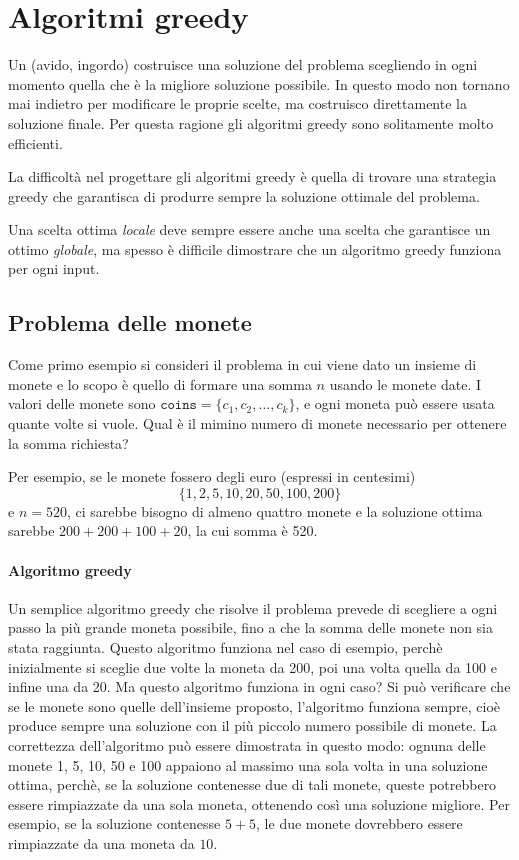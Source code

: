 \chapter{Algoritmi greedy}


Un  (avido, ingordo)
costruisce una soluzione del problema
scegliendo in ogni momento quella che è 
la migliore soluzione possibile.
In questo modo
non tornano mai indietro per modificare le proprie scelte,
ma costruisco direttamente la soluzione finale.
Per questa ragione gli algoritmi greedy sono solitamente
molto efficienti.

La difficoltà nel progettare gli algoritmi greedy
è quella di trovare una strategia greedy che garantisca 
di produrre sempre la soluzione ottimale del problema.

Una scelta ottima \textit{locale} deve sempre 
essere anche una scelta che garantisce un ottimo \textit{globale},
ma spesso è difficile dimostrare che un algoritmo greedy
funziona per ogni input.


\section{Problema delle monete}

Come primo esempio si consideri il problema 
in cui viene dato un insieme di monete e lo scopo
è quello di formare una somma $n$ usando le monete date.
I valori delle monete sono
$\texttt{coins}=\{c_1,c_2,\ldots,c_k\}$,
e ogni moneta può essere usata quante volte si vuole.
Qual è il mimino numero di monete necessario per ottenere la somma richiesta?

Per esempio, se le monete fossero degli euro (espressi in centesimi)
\[\{1,2,5,10,20,50,100,200\}\]
e $n=520$,
ci sarebbe bisogno di almeno quattro monete
e la soluzione ottima sarebbe
$200+200+100+20$, la cui somma è 520.

\subsubsection{Algoritmo greedy}

Un semplice algoritmo greedy che risolve il problema 
prevede di scegliere a ogni passo la più grande moneta possibile,
fino a che la somma delle monete non sia stata raggiunta.
Questo algoritmo funziona nel caso di esempio,
perchè inizialmente si sceglie due volte la moneta da 200,
poi una volta quella da 100 e infine una da 20.
Ma questo algoritmo funziona in ogni caso?
Si può verificare che se le monete sono quelle dell'insieme
proposto, l'algoritmo funziona sempre, cioè produce sempre 
una soluzione con il più piccolo numero possibile di monete.
La correttezza dell'algoritmo può essere dimostrata in questo modo:
ognuna delle monete 1, 5, 10, 50 e 100 appaiono al massimo 
una sola volta in una soluzione ottima,
perchè, se la soluzione contenesse due di tali monete,
queste potrebbero essere rimpiazzate da una sola moneta,
ottenendo così una soluzione migliore.
Per esempio, se la soluzione contenesse $5+5$,
le due monete dovrebbero essere rimpiazzate da una moneta da $10$.


